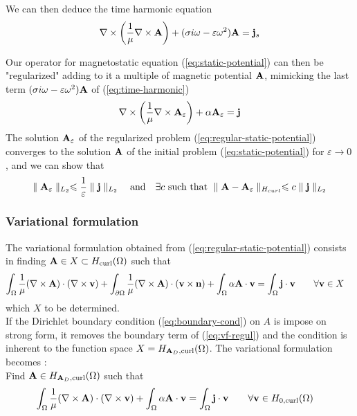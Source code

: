We can then deduce the time harmonic equation
\begin{equation}
  \label{eq:time-harmonic}
  \nabla \times \left( \frac{1}{\mu} \nabla \times \mathbf{A} \right)
  + (\sigma i \omega - \varepsilon \omega^2) \mathbf{A} = \mathbf{j}_s
\end{equation}

Our operator for magnetostatic equation (\ref{eq:static-potential}) can then be
"regularized" adding to it a multiple of magnetic potential $\mathbf{A}$, mimicking the
last term $(\sigma i \omega - \varepsilon\omega^2) \mathbf{A}$ of (\ref{eq:time-harmonic})
\begin{equation}
  \label{eq:regular-static-potential}
  \nabla \times \left( \frac{1}{\mu} \nabla \times \mathbf{A}_{\varepsilon} \right)
  + \alpha \mathbf{A}_{\varepsilon} = \mathbf{j}
\end{equation}
The solution $\mathbf{A}_{\varepsilon}$ of the regularized problem
(\ref{eq:regular-static-potential}) converges to the solution $\mathbf{A}$ of the
initial problem (\ref{eq:static-potential}) for $\varepsilon \longrightarrow 0$,
and we can show that
\begin{equation}
  \label{eq:bounds-reg}
  \parallel \mathbf{A}_{\varepsilon} \parallel_{L_2}
  \leqslant \frac{1}{\varepsilon} \parallel \mathbf{j} \parallel_{L_2}
  \quad
  \text{and}
  \quad
  \exists c ~\text{such that}
  ~\parallel \mathbf{A} - \mathbf{A}_{\varepsilon} \parallel_{H_{curl}}
  \leqslant c \parallel \mathbf{j} \parallel_{L_2}
\end{equation}

\subsubsection{Variational formulation}
The variational formulation obtained from (\ref{eq:regular-static-potential})
consists in finding $\mathbf{A} \in X \subset H_{\mathrm{curl}}(\Omega)$ such that
\begin{alignat}{2}
  \label{eq:vf-regul}
  \int_{\Omega}\frac{1}{\mu}(\nabla \times \mathbf{A}) \cdot (\nabla \times \mathbf{v})
  + \int_{\partial \Omega}\frac{1}{\mu} (\nabla\times\mathbf{A}) \cdot (\mathbf{v}\times\mathbf{n} )
  + \int_{\Omega}\alpha \mathbf{A} \cdot \mathbf{v}  &= \int_{\Omega} \mathbf{j} \cdot \mathbf{v}
  &&\quad \forall \mathbf{v} \in X
\end{alignat}
which $X$ to be determined. \\

If the Dirichlet boundary condition (\ref{eq:boundary-cond}) on $A$ is impose on
strong form, it removes the boundary term of (\ref{eq:vf-regul})
and the condition is inherent to the function space
$X = H_{\mathbf{A}_D,\mathrm{curl}}(\Omega)$. The variational formulation becomes :\\
Find $\mathbf{A} \in H_{\mathbf{A}_D,\mathrm{curl}}(\Omega)$ such that
\begin{alignat}{2}
  \label{eq:vf-regul-strong}
  \int_{\Omega}\frac{1}{\mu}(\nabla \times \mathbf{A}) \cdot (\nabla \times \mathbf{v})
  + \int_{\Omega}\alpha \mathbf{A} \cdot \mathbf{v}  &= \int_{\Omega} \mathbf{j} \cdot \mathbf{v}
  && \quad \forall \mathbf{v} \in H_{0,\mathrm{curl}}(\Omega)
\end{alignat}

